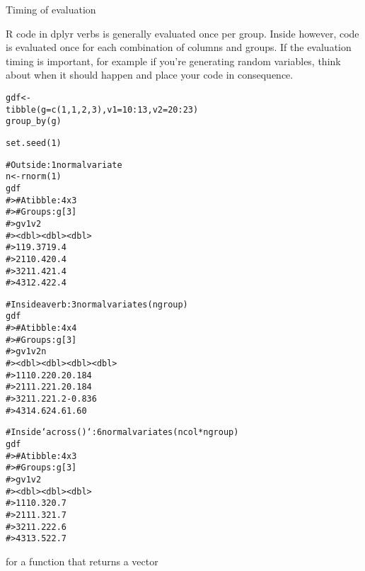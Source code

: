 \documentclass[a4paper]{book}
\begin{document}
\begin{Section}{Timing of evaluation}

R code in dplyr verbs is generally evaluated once per group.
Inside  however, code is evaluated once for each
combination of columns and groups. If the evaluation timing is
important, for example if you're generating random variables, think
about when it should happen and place your code in consequence.

\begin{alltt}gdf <-
  tibble(g = c(1, 1, 2, 3), v1 = 10:13, v2 = 20:23) %>%
  group_by(g)

set.seed(1)

# Outside: 1 normal variate
n <- rnorm(1)
gdf %>% mutate(across(v1:v2, ~ .x + n))
#> # A tibble: 4 x 3
#> # Groups:   g [3]
#>       g    v1    v2
#>   <dbl> <dbl> <dbl>
#> 1     1  9.37  19.4
#> 2     1 10.4   20.4
#> 3     2 11.4   21.4
#> 4     3 12.4   22.4

# Inside a verb: 3 normal variates (ngroup)
gdf %>% mutate(n = rnorm(1), across(v1:v2, ~ .x + n))
#> # A tibble: 4 x 4
#> # Groups:   g [3]
#>       g    v1    v2      n
#>   <dbl> <dbl> <dbl>  <dbl>
#> 1     1  10.2  20.2  0.184
#> 2     1  11.2  21.2  0.184
#> 3     2  11.2  21.2 -0.836
#> 4     3  14.6  24.6  1.60

# Inside `across()`: 6 normal variates (ncol * ngroup)
gdf %>% mutate(across(v1:v2, ~ .x + rnorm(1)))
#> # A tibble: 4 x 3
#> # Groups:   g [3]
#>       g    v1    v2
#>   <dbl> <dbl> <dbl>
#> 1     1  10.3  20.7
#> 2     1  11.3  21.7
#> 3     2  11.2  22.6
#> 4     3  13.5  22.7
\end{alltt}

\end{Section}
%
\begin{SeeAlso}
 for a function that returns a vector
\end{SeeAlso}
%
\end{document}
